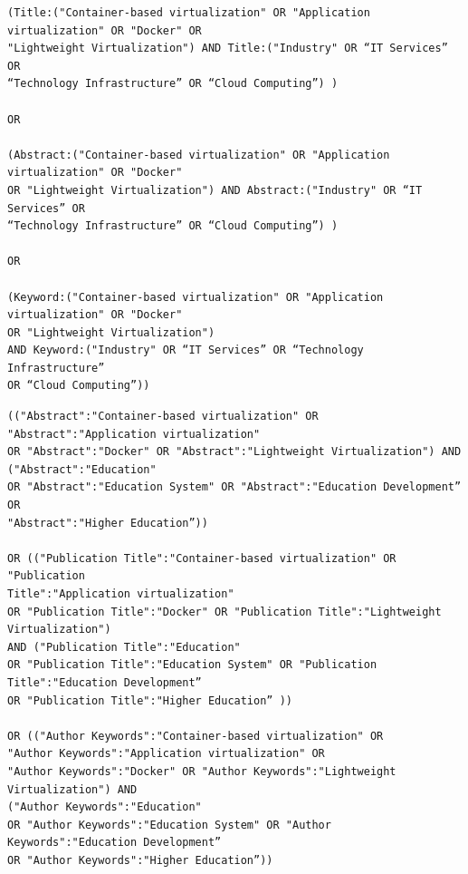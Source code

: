 \begin{tcolorbox}[
		colback=gray!5,
		colframe=black!60,
		title=Cadena de búsqueda en ACM para extensión,
		fonttitle=\bfseries,
		sharp corners=south
	]
	\scriptsize %
	\begin{verbatim}
(Title:("Container-based virtualization" OR "Application virtualization" OR "Docker" OR 
"Lightweight Virtualization") AND Title:("Industry" OR “IT Services” OR 
“Technology Infrastructure” OR “Cloud Computing”) ) 

OR

(Abstract:("Container-based virtualization" OR "Application virtualization" OR "Docker" 
OR "Lightweight Virtualization") AND Abstract:("Industry" OR “IT Services” OR 
“Technology Infrastructure” OR “Cloud Computing”) )

OR

(Keyword:("Container-based virtualization" OR "Application virtualization" OR "Docker" 
OR "Lightweight Virtualization")
AND Keyword:("Industry" OR “IT Services” OR “Technology Infrastructure” 
OR “Cloud Computing”))

\end{verbatim}
\end{tcolorbox}

\begin{tcolorbox}[
		colback=gray!5,
		colframe=black!60,
		title=Cadena de búsqueda en IEE para educación,
		fonttitle=\bfseries,
		sharp corners=south
	]
	\scriptsize %
	\begin{verbatim}
(("Abstract":"Container-based virtualization" OR "Abstract":"Application virtualization" 
OR "Abstract":"Docker" OR "Abstract":"Lightweight Virtualization") AND ("Abstract":"Education" 
OR "Abstract":"Education System" OR "Abstract":"Education Development”  OR 
"Abstract":"Higher Education”)) 

OR (("Publication Title":"Container-based virtualization" OR "Publication 
Title":"Application virtualization" 
OR "Publication Title":"Docker" OR "Publication Title":"Lightweight Virtualization") 
AND ("Publication Title":"Education" 
OR "Publication Title":"Education System" OR "Publication Title":"Education Development”  
OR "Publication Title":"Higher Education” ))

OR (("Author Keywords":"Container-based virtualization" OR 
"Author Keywords":"Application virtualization" OR 
"Author Keywords":"Docker" OR "Author Keywords":"Lightweight Virtualization") AND 
("Author Keywords":"Education" 
OR "Author Keywords":"Education System" OR "Author Keywords":"Education Development”  
OR "Author Keywords":"Higher Education”))
\end{verbatim}
\end{tcolorbox}


